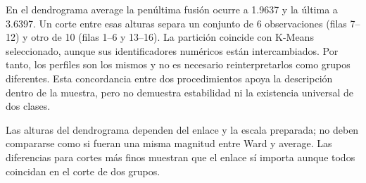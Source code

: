 \documentclass[11pt]{article}
\begin{document}
En el dendrograma average la penúltima fusión ocurre a 1.9637 y la última
a 3.6397. Un corte entre esas alturas separa un conjunto de 6 observaciones
(filas 7--12) y otro de 10 (filas 1--6 y 13--16). La partición coincide
con K-Means seleccionado, aunque sus identificadores numéricos están
intercambiados. Por tanto, los perfiles son los mismos y no es necesario
reinterpretarlos como grupos diferentes. Esta concordancia entre dos
procedimientos apoya la descripción dentro de la muestra, pero no demuestra
estabilidad ni la existencia universal de dos clases.

Las alturas del dendrograma dependen del enlace y la escala preparada;
no deben compararse como si fueran una misma magnitud entre Ward y average.
Las diferencias para cortes más finos muestran que el enlace sí importa
aunque todos coincidan en el corte de dos grupos.
\FloatBarrier
\clearpage
\end{document}
